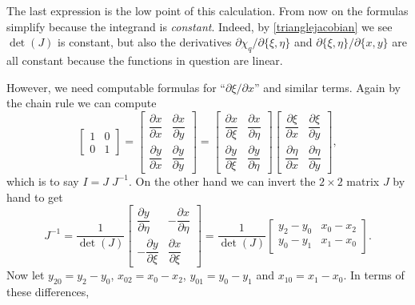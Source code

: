 The last expression is the low point of this calculation.  From now on the formulas simplify because the integrand is \emph{constant}.  Indeed, by \eqref{trianglejacobian} we see $\det(J)$ is constant, but also the derivatives $\partial \chi_q/\partial\{\xi,\eta\}$ and $\partial\{\xi,\eta\}/\partial\{x,y\}$ are all constant because the functions in question are linear.

However, we need computable formulas for ``$\partial \xi/\partial x$'' and similar terms.  Again by the chain rule we can compute
\begin{equation*}
\begin{bmatrix}
    1 & 0 \\[0.2em]
    0 & 1
\end{bmatrix}
=\begin{bmatrix}
    \dfrac{\partial x}{\partial x} & \dfrac{\partial x}{\partial y} \\[1.0em]
    \dfrac{\partial y}{\partial x} & \dfrac{\partial y}{\partial y}
\end{bmatrix}
=
\begin{bmatrix}
    \dfrac{\partial x}{\partial \xi} & \dfrac{\partial x}{\partial \eta} \\[1.0em]
    \dfrac{\partial y}{\partial \xi} & \dfrac{\partial y}{\partial \eta}
\end{bmatrix}
\begin{bmatrix}
    \dfrac{\partial \xi}{\partial x} & \dfrac{\partial \xi}{\partial y} \\[1.0em]
    \dfrac{\partial \eta}{\partial x} & \dfrac{\partial \eta}{\partial y}
\end{bmatrix},
\end{equation*}
which is to say $I=J\; J^{-1}$.  On the other hand we can invert the $2\times 2$ matrix $J$ by hand to get
\begin{equation}
J^{-1}
= \frac{1}{\det(J)}
\begin{bmatrix}
    \dfrac{\partial y}{\partial \eta} & -\dfrac{\partial x}{\partial \eta} \\[1.0em]
    -\dfrac{\partial y}{\partial \xi} & \dfrac{\partial x}{\partial \xi}
\end{bmatrix}
= \frac{1}{\det(J)}
\begin{bmatrix}
    y_2-y_0 & x_0-x_2 \\
    y_0-y_1 & x_1-x_0
\end{bmatrix}.  \label{Jinverse}
\end{equation}
Now let $y_{20}=y_2-y_0$, $x_{02}=x_0-x_2$, $y_{01}=y_0-y_1$ and $x_{10}=x_1-x_0$.  In terms of these differences,
